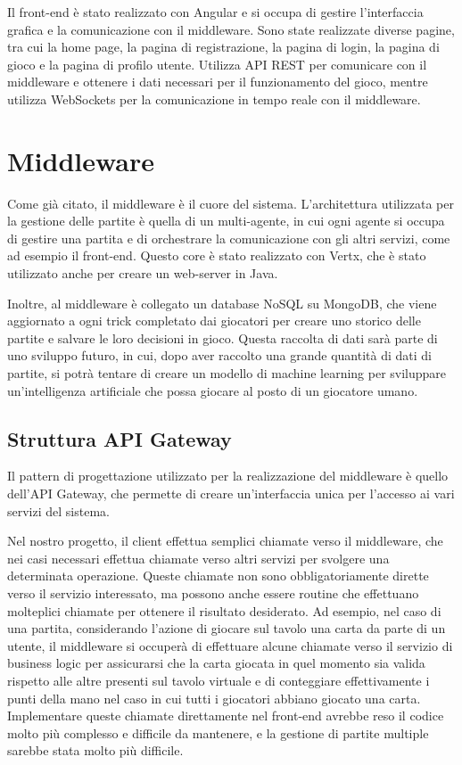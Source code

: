 Il front-end è stato realizzato con Angular e si occupa di gestire l'interfaccia grafica e la comunicazione con il middleware.
Sono state realizzate diverse pagine, tra cui la home page, la pagina di registrazione, la pagina di login, la pagina di gioco e la pagina di profilo utente.
Utilizza API REST per comunicare con il middleware e ottenere i dati necessari per il funzionamento del gioco, mentre utilizza WebSockets per la comunicazione in tempo reale con il middleware. 


\section{Middleware}

Come già citato, il middleware è il cuore del sistema. L'architettura utilizzata per la gestione delle partite è quella di un multi-agente, in cui ogni agente si occupa di gestire una partita 
e di orchestrare la comunicazione con gli altri servizi, come ad esempio il front-end. Questo core è stato realizzato con Vertx, che è stato utilizzato anche per creare un web-server in Java.

Inoltre, al middleware è collegato un database NoSQL su MongoDB, che viene aggiornato a ogni trick completato dai giocatori per creare uno storico delle partite e salvare le loro decisioni in gioco. 
Questa raccolta di dati sarà parte di uno sviluppo futuro, in cui, dopo aver raccolto una grande quantità di dati di partite, si potrà tentare di creare un modello di machine learning per sviluppare un'intelligenza artificiale che possa giocare al posto di un giocatore umano.

\subsection{Struttura API Gateway}

Il pattern di progettazione utilizzato per la realizzazione del middleware è quello dell'API Gateway, che permette di creare un'interfaccia unica per l'accesso ai vari servizi del sistema.

Nel nostro progetto, il client effettua semplici chiamate verso il middleware, che nei casi necessari effettua chiamate verso altri servizi per svolgere una determinata operazione.
Queste chiamate non sono obbligatoriamente dirette verso il servizio interessato, ma possono anche essere routine che effettuano molteplici chiamate per ottenere il risultato desiderato. 
Ad esempio, nel caso di una partita, considerando l'azione di giocare sul tavolo una carta da parte di un utente, il middleware si occuperà di effettuare alcune chiamate verso il servizio di business
logic per assicurarsi che la carta giocata in quel momento sia valida rispetto alle altre presenti sul tavolo virtuale e di conteggiare effettivamente i punti della mano nel caso in cui tutti i giocatori abbiano giocato una carta. Implementare queste chiamate direttamente nel front-end avrebbe reso il codice molto più complesso e difficile da mantenere, e la gestione di partite multiple sarebbe stata molto più difficile.

